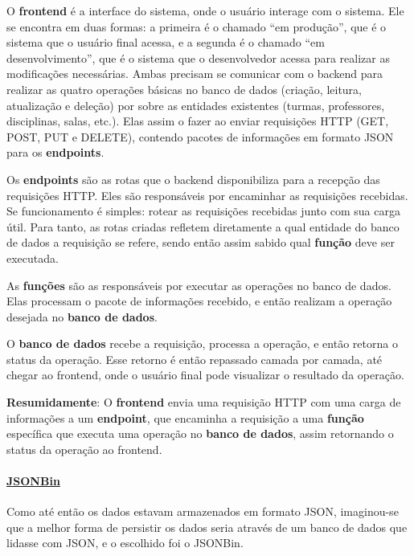 
O \textbf{frontend} é a interface do sistema, onde o usuário interage com o sistema. Ele se encontra em duas formas: a primeira é o chamado ``em produção'', que é o sistema que o usuário final acessa, e a segunda é o chamado ``em desenvolvimento'', que é o sistema que o desenvolvedor acessa para realizar as modificações necessárias. Ambas precisam se comunicar com o backend para realizar as quatro operações básicas no banco de dados (criação, leitura, atualização e deleção) por sobre as entidades existentes (turmas, professores, disciplinas, salas, etc.). Elas assim o fazer ao enviar requisições HTTP (GET, POST, PUT e DELETE), contendo pacotes de informações em formato JSON para os \textbf{endpoints}.

Os \textbf{endpoints} são as rotas que o backend disponibiliza para a recepção das requisições HTTP. Eles são responsáveis por encaminhar as requisições recebidas. Se funcionamento é simples: rotear as requisições recebidas junto com sua carga útil. Para tanto, as rotas criadas refletem diretamente a qual entidade do banco de dados a requisição se refere, sendo então assim sabido qual \textbf{função} deve ser executada.

As \textbf{funções} são as responsáveis por executar as operações no banco de dados. Elas processam o pacote de informações recebido, e então realizam a operação desejada no \textbf{banco de dados}.

O \textbf{banco de dados} recebe a requisição, processa a operação, e então retorna o status da operação. Esse retorno é então repassado camada por camada, até chegar ao frontend, onde o usuário final pode visualizar o resultado da operação.

\textbf{Resumidamente}: O \textbf{frontend} envia uma requisição HTTP com uma carga de informações a um \textbf{endpoint}, que encaminha a requisição a uma \textbf{função} específica que executa uma operação no \textbf{banco de dados}, assim retornando o status da operação ao frontend.

\paragraph*{\href{https://jsonbin.io/}{JSONBin}}

Como até então os dados estavam armazenados em formato JSON, imaginou-se que a melhor forma de persistir os dados seria através de um banco de dados que lidasse com JSON, e o escolhido foi o JSONBin.

